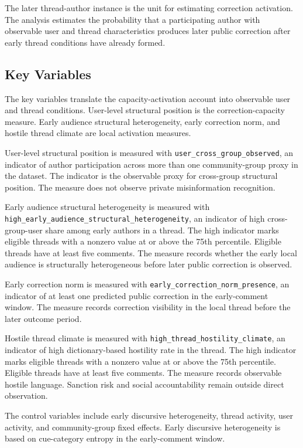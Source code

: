 \documentclass[namedate,unnumsec,webpdf,contemporary,large]{oup-authoring-template}
\begin{document}
The later thread-author instance is the unit for estimating correction activation. The analysis estimates the probability that a participating author with observable user and thread characteristics produces later public correction after early thread conditions have already formed.

\subsection{Key Variables}


The key variables translate the capacity-activation account into observable user and thread conditions. User-level structural position is the correction-capacity measure. Early audience structural heterogeneity, early correction norm, and hostile thread climate are local activation measures.

User-level structural position is measured with \texttt{user\_cross\_group\_observed}, an indicator of author participation across more than one community-group proxy in the dataset. The indicator is the observable proxy for cross-group structural position. The measure does not observe private misinformation recognition.

Early audience structural heterogeneity is measured with \texttt{high\_early\_audience\_structural\_heterogeneity}, an indicator of high cross-group-user share among early authors in a thread. The high indicator marks eligible threads with a nonzero value at or above the 75th percentile. Eligible threads have at least five comments. The measure records whether the early local audience is structurally heterogeneous before later public correction is observed.

Early correction norm is measured with \texttt{early\_correction\_norm\_presence}, an indicator of at least one predicted public correction in the early-comment window. The measure records correction visibility in the local thread before the later outcome period.

Hostile thread climate is measured with \texttt{high\_thread\_hostility\_climate}, an indicator of high dictionary-based hostility rate in the thread. The high indicator marks eligible threads with a nonzero value at or above the 75th percentile. Eligible threads have at least five comments. The measure records observable hostile language. Sanction risk and social accountability remain outside direct observation.

The control variables include early discursive heterogeneity, thread activity, user activity, and community-group fixed effects. Early discursive heterogeneity is based on cue-category entropy in the early-comment window.
\end{document}
